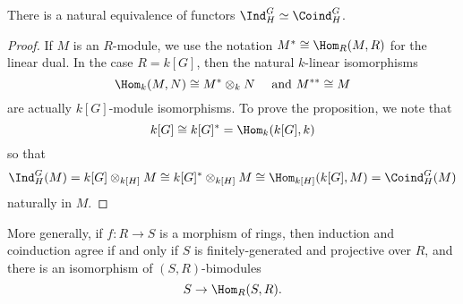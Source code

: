 \documentclass{willowtreebook}
\begin{document}
    \begin{proposition}
        There is a natural equivalence of functors $\Ind_H^G \simeq \Coind_H^G$. 
    \end{proposition}
    \begin{proof}
      If $M$ is an $R$-module, we use the notation $M^* \cong \Hom_R(M,R)$ for the linear dual. In the case $R = k[G]$, then the natural $k$-linear isomorphisms
      \[
      \Hom_k(M,N) \cong M^* \otimes_kN \quad \text{ and } M^{**} \cong M
      \]
      are actually $k[G]$-module isomorphisms. To prove the proposition, we note that
      \[
      k[G] \cong k[G]^* = \Hom_k(k[G],k)
      \]
      so that
      \[
      \Ind_H^G(M) = k[G] \otimes_{k[H]} M \cong k[G]^* \otimes_{k[H]}M \cong \Hom_{k[H]}(k[G],M) = \Coind_H^G(M)
      \]
      naturally in $M$. 
    \end{proof}
\begin{remark}
    More generally, if $f \colon R \to S$ is a morphism of rings, then induction and coinduction agree if and only if $S$ is finitely-generated and projective over $R$, and there is an isomorphism of $(S,R)$-bimodules
    \[
    S \to \Hom_R(S,R).
    \]
\end{remark}
\par\bigskip\noindent
\end{document}
